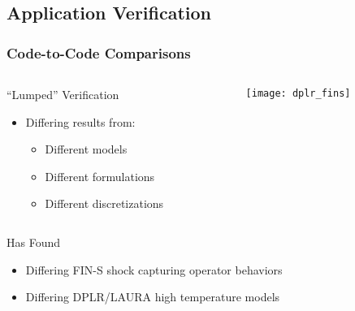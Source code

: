 \subsection{Application Verification}

\begin{frame}
\frametitle{Code-to-Code Comparisons}
\begin{columns}
\begin{column}{.5\textwidth}
\begin{block}{``Lumped'' Verification}
\begin{itemize}
\item Differing results from:
\begin{itemize}
\item Different models
\item Different formulations
\item Different discretizations
\end{itemize}
\end{itemize}
\end{block}
\end{column}
\begin{column}{.5\textwidth}
\begin{center}
\texttt{[image: dplr\_fins]}
\end{center}
\end{column}
\end{columns}

\pause

\begin{block}{Has Found}
\begin{itemize}
\item Differing FIN-S shock capturing operator behaviors
\item Differing DPLR/LAURA high temperature models
\end{itemize}
\end{block}
\end{frame}

